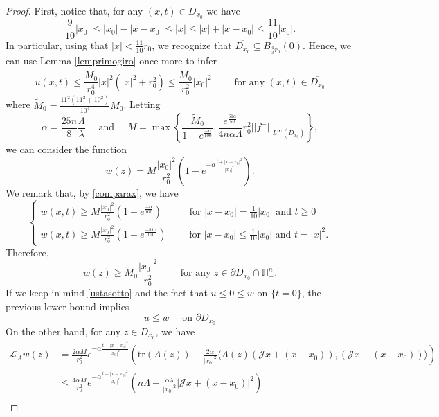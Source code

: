 \documentclass[10pt,a4paper]{amsart}
\def \H {{\mathbb H}}
\def \L {\mathcal{L}}
\newcommand{\J}{\mathcal{J}}
\begin{document}
\begin{proof}
First, notice that, for any $(x,t)\in \overline{D_{x_0}}$ we have 
\begin{equation}\label{comparax}
\frac{9}{10}|x_0|\leq |x_0|-|x-x_0|\leq |x| \leq |x|+|x-x_0|\leq \frac{11}{10}|x_0|.
\end{equation}
In particular, using that $|x|<\frac{11}{10}r_0$, we recognize that $\overline{D_{x_0}}\subseteq B_{\frac{4}{3}r_0}(0)$. Hence, we can use Lemma \ref{lemprimogiro} once more to infer
\begin{equation}\label{ustasotto}
u(x,t)\leq \frac{M_0}{r_0^4}|x|^2(|x|^2+r_0^2)\leq \frac{\tilde{M}_0}{r_0^2}|x_0|^2 \qquad\mbox{ for any }(x,t)\in \overline{D_{x_0}}
\end{equation}
where $\tilde{M}_0=\frac{11^2(11^2+10^2)}{10^4} M_0$. Letting
$$
\alpha=\frac{25n}{8}\frac{\Lambda}{\lambda}
\quad\mbox{ and }\quad M=\max\left\{\frac{\tilde{M}_0}{1- e^{\frac{-\alpha}{100}}}, \frac{e^{\frac{61\alpha}{50}}}{4n\alpha\Lambda} r^2_0 ||f^-||_{L^\infty(D_{x_0})} \right\},%
$$
we can consider the function
$$
w(z)=M \frac{|x_0|^2}{r^2_0} \left( 1- e^{-\alpha\frac{t+|x-x_0|^2}{|x_0|^2}}\right).
$$
We remark that, by \eqref{comparax}, we have
$$
\begin{cases}
w(x,t) \geq M \frac{|x_0|^2}{r^2_0} \left( 1- e^{\frac{-\alpha}{100}}\right) \qquad\,\,\,\mbox{ for } |x-x_0|=\frac{1}{10}|x_0|\mbox{ and }t\geq 0  \\
w(x,t)\geq M \frac{|x_0|^2}{r^2_0} \left( 1- e^{\frac{-81\alpha}{100}}\right) \qquad\mbox{ for } |x-x_0|\leq \frac{1}{10}|x_0|\mbox{ and }t=|x|^2.
\end{cases}
$$
Therefore,
$$
w(z)\geq \tilde{M}_0 \frac{|x_0|^2}{r^2_0}\qquad\mbox{ for any }z\in \partial D_{x_0}\cap \H^n_+.
$$
If we keep in mind \eqref{ustasotto} and the fact that $u\leq 0\leq w$ on $\{t=0\}$, the previous lower bound implies
\begin{equation}\label{ustasottoalbordo}
u\leq w\quad\mbox{ on }\partial D_{x_0}
\end{equation}
On the other hand, for any $z\in D_{x_0}$, we have
\begin{align*}
\L_A w (z)&= 
\frac{2\alpha M}{r_0^2}e^{-\alpha\frac{t+|x-x_0|^2}{|x_0|^2}}\left( \text{tr}(A(z)) -\frac{2\alpha}{|x_0|^2}\langle A(z)\left(\J x + (x-x_0)\right),\left(\J x + (x-x_0)\right) \rangle\right) \\
&\leq \frac{4\alpha M}{r_0^2}e^{-\alpha\frac{t+|x-x_0|^2}{|x_0|^2}}\left( n\Lambda -\frac{\alpha\lambda}{|x_0|^2}\left|\J x + (x-x_0)\right|^2 \right) \\

\end{align*}
\end{proof}
\end{document}
